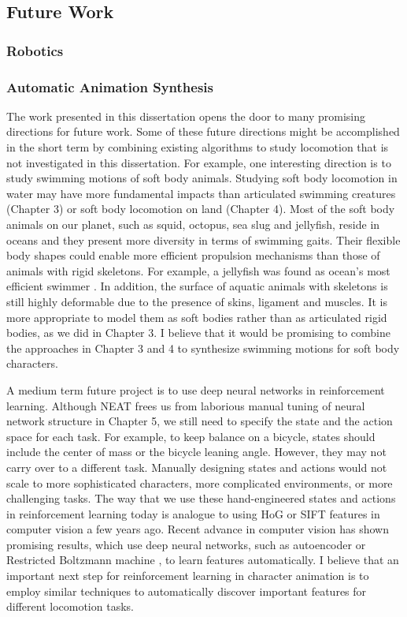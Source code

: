 \subsection{Future Work}
\subsubsection{Robotics}
\subsubsection{Automatic Animation Synthesis}
The work presented in this dissertation opens the door to many promising directions for future work. Some of these future directions might be accomplished in the short term by combining existing algorithms to study locomotion that is not investigated in this dissertation. For example, one interesting direction is to study swimming motions of soft body animals. Studying soft body locomotion in water may have more fundamental impacts than articulated swimming creatures (Chapter 3) or soft body locomotion on land (Chapter 4). Most of the soft body animals on our planet, such as squid, octopus, sea slug and jellyfish, reside in oceans and they present more diversity in terms of swimming gaits. Their flexible body shapes could enable more efficient propulsion mechanisms than those of animals with rigid skeletons. For example, a jellyfish was found as ocean's most efficient swimmer \cite{Gemmell:2013}. In addition, the surface of aquatic animals with skeletons is still highly deformable due to the presence of skins, ligament and muscles. It is more appropriate to model them as soft bodies rather than as articulated rigid bodies, as we did in Chapter 3. I believe that it would be promising to combine the approaches in Chapter 3 and 4 to synthesize swimming motions for soft body characters.

A medium term future project is to use deep neural networks in reinforcement learning. Although NEAT frees us from laborious manual tuning of neural network structure in Chapter 5, we still need to specify the state and the action space for each task. For example, to keep balance on a bicycle, states should include the center of mass or the bicycle leaning angle. However, they may not carry over to a different task. Manually designing states and actions would not scale to more sophisticated characters, more complicated environments, or more challenging tasks. The way that we use these hand-engineered states and actions in reinforcement learning today is analogue to using HoG or SIFT features in computer vision a few years ago. Recent advance in computer vision has shown promising results, which use deep neural networks, such as autoencoder \cite{Vincent:2008} or Restricted Boltzmann machine \cite{Hinton:2012}, to learn features automatically. I believe that an important next step for reinforcement learning in character animation is to employ similar techniques to automatically discover important features for different locomotion tasks.

